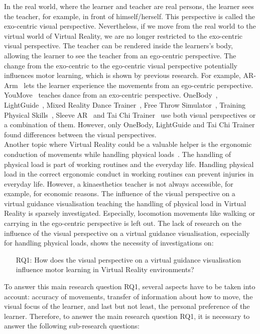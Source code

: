 In the real world, where the learner and teacher are real persons, the learner sees the teacher, for example, in front of himself/herself. This perspective is called the exo-centric visual perspective. Nevertheless, if we move from the real world to the virtual world of Virtual Reality, we are no longer restricted to the exo-centric visual perspective. The teacher can be rendered inside the learners's body, allowing the learner to see the teacher from an ego-centric perspective. The change from the exo-centric to the ego-centric visual perspective potentially influences motor learning, which is shown by previous research. For example, AR-Arm~\cite{ararm} lets the learner experience the movements from an ego-centric perspective. YouMove~\cite{YouMove} teaches dance from an exo-centric perspective. OneBody~\cite{onebody}, LightGuide~\cite{lightguide}, Mixed Reality Dance Trainer~\cite{mrdancetrainer}, Free Throw Simulator~\cite{freethrowsimulator}, Training Physical Skills~\cite{trainingphysicalskills}, Sleeve AR~\cite{sleevear} and Tai Chi Trainer~\cite{thaichichua} use both visual perspectives or a combination of them. However, only OneBody, LightGuide and Tai Chi Trainer found differences between the visual perspectives.\\
Another topic where Virtual Reality could be a valuable helper is the ergonomic conduction of movements while handling physical loads~\cite{nursecare,kitt}. The handling of physical load is part of working routines and the everyday life. Handling physical load in the correct ergonomic conduct in working routines can prevent injuries in everyday life. However, a kinaesthetics teacher is not always accessible, for example, for economic reasons. The influence of the visual perspective on a virtual guidance visualisation teaching the handling of physical load in Virtual Reality is sparsely investigated. Especially, locomotion movements like walking or carrying in the ego-centric perspective is left out. The lack of research on the influence of the visual perspective on a virtual guidance visualisation, especially for handling physical loads, shows the necessity of investigations on:
\begin{itemize}
	\item[RQ1:] How does the visual perspective on a virtual guidance visualisation influence motor learning in Virtual Reality environments?
\end{itemize}
To answer this main research question RQ1, several aspects have to be taken into account: accuracy of movements, transfer of information about how to move, the visual focus of the learner, and last but not least, the personal preference of the learner. Therefore, to answer the main research question RQ1, it is necessary to answer the following sub-research questions:
